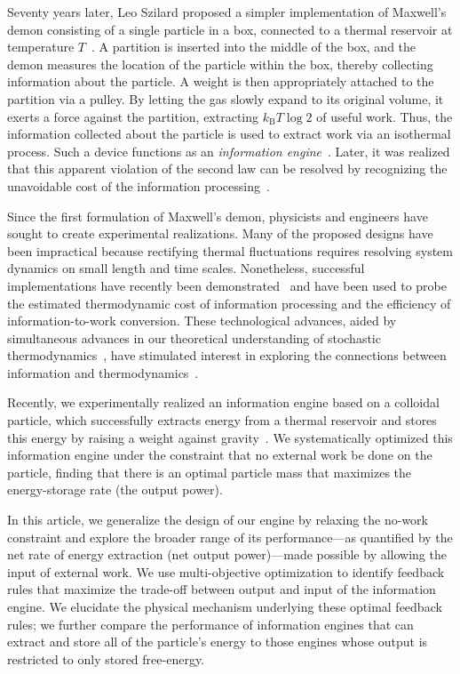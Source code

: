 \documentclass[%
reprint,
bibnotes, amsmath, amssymb, aps, pre,
 showkeys,
floatfix
]{revtex4-2}
\newcommand{\kT}{k_{\mathrm{B}}T}
\begin{document}
Seventy years later, Leo Szilard proposed a simpler implementation of Maxwell's demon consisting of a single particle in a box, connected to a thermal reservoir at temperature $T$~\cite{Szilard1964}.
A partition is inserted into the middle of the box, and the demon measures the location of the particle within the box, thereby collecting information about the particle.
A weight is then appropriately attached to the partition via a pulley.
By letting the gas slowly expand to its original volume, it exerts a force against the partition, extracting $\kT\log 2$ of useful work. 
Thus, the information collected about the particle is used to extract work via an isothermal process. 
Such a device functions as an \emph{information engine}~\cite{Paneru2020}. 
Later, it was realized that this apparent violation of the second law can be resolved by recognizing the unavoidable cost of the information processing~\cite{leff_book2002,Bennett1982}. 

Since the first formulation of Maxwell's demon, physicists and engineers have sought to create experimental realizations. 
Many of the proposed designs have been impractical because rectifying thermal fluctuations requires resolving system dynamics on small length and time scales.
Nonetheless, successful implementations have recently been demonstrated~\cite{Toyabe2010,Lee2018,admon2018,Ribezzi-Crivellari2019,Paneru2018b} and have been used to probe the estimated thermodynamic cost of information processing and the efficiency of information-to-work conversion. 
These technological advances, aided by simultaneous advances in our theoretical understanding of stochastic thermodynamics~\cite{Cao2009,Jarzynski2011,seifert_2012}, have stimulated interest in exploring the connections between information and thermodynamics~\cite{Parrondo2015a}. 

Recently, we experimentally realized an information engine based on a colloidal particle, which successfully extracts energy from a thermal reservoir and stores this energy by raising a weight against gravity~\cite{Saha2021}.
We systematically optimized this information engine under the constraint that no external work be done on the particle, finding that there is an optimal particle mass that maximizes the energy-storage rate (the output power).

In this article, we generalize the design of our engine by relaxing the no-work constraint and explore the broader range of its performance---as quantified by the net rate of energy extraction (net output power)---made possible by allowing the input of external work.
We use multi-objective optimization to identify feedback rules that maximize the trade-off between output and input of the information engine.
We elucidate the physical mechanism underlying these optimal feedback rules; we further compare the performance of information engines that can extract and store all of the particle's energy to those engines whose output is restricted to only stored free-energy.
\end{document}
